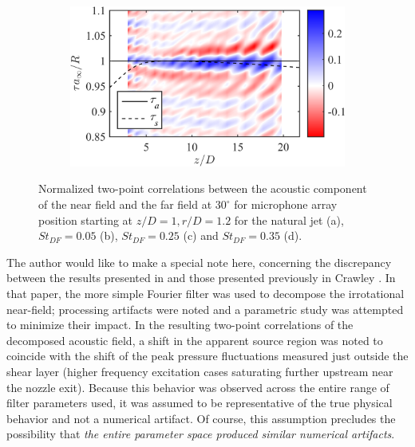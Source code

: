 \begin{figure}
\begin{subfigure}{.5\textwidth}
		\caption{}
		\label{fig:ch3_xcorrOA_St025}
	\end{subfigure}%
	\begin{subfigure}{.5\textwidth}
		\centering
		\includegraphics[width=0.95\linewidth]{Figures/ch3_St035_r120_ff30xcor_oa.png}
		\caption{}
		\label{fig:ch3_xcorrOA_St035}
	\end{subfigure}
	\caption{Normalized two-point correlations between the acoustic component of the near field and the far field at $30^\circ$ for microphone array position starting at $z/D = 1, r/D = 1.2$ for the natural jet (a), $St_{DF} = 0.05$ (b), $St_{DF} = 0.25$ (c) and $St_{DF} = 0.35$ (d).}
	\label{fig:ch3_xcorrOA}
\end{figure}

The author would like to make a special note here, concerning the discrepancy between the results presented in  and those presented previously in Crawley \etal \citep{Crawley2015}.
In that paper, the more simple Fourier filter was used to decompose the irrotational near-field; processing artifacts were noted and a parametric study was attempted to minimize their impact.
In the resulting two-point correlations of the decomposed acoustic field, a shift in the apparent source region was noted to coincide with the shift of the peak pressure fluctuations measured just outside the shear layer (higher frequency excitation cases saturating further upstream near the nozzle exit).
Because this behavior was observed across the entire range of filter parameters used, it was assumed to be representative of the true physical behavior and not a numerical artifact.
Of course, this assumption precludes the possibility that \textit{the entire parameter space produced similar numerical artifacts}. 

